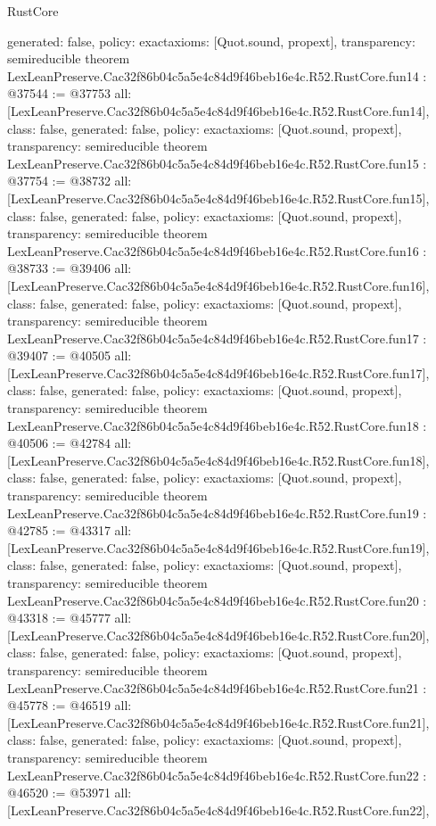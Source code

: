 \begin{lexlean}{RustCore}
\begin{coremodule}
{  generated: false,
  policy: exact{axioms: [Quot.sound, propext]},
  transparency: semireducible
}
theorem LexLeanPreserve.Cac32f86b04c5a5e4c84d9f46beb16e4c.R52.RustCore.fun14 : @37544 := @37753 {
  all: [LexLeanPreserve.Cac32f86b04c5a5e4c84d9f46beb16e4c.R52.RustCore.fun14],
  class: false,
  generated: false,
  policy: exact{axioms: [Quot.sound, propext]},
  transparency: semireducible
}
theorem LexLeanPreserve.Cac32f86b04c5a5e4c84d9f46beb16e4c.R52.RustCore.fun15 : @37754 := @38732 {
  all: [LexLeanPreserve.Cac32f86b04c5a5e4c84d9f46beb16e4c.R52.RustCore.fun15],
  class: false,
  generated: false,
  policy: exact{axioms: [Quot.sound, propext]},
  transparency: semireducible
}
theorem LexLeanPreserve.Cac32f86b04c5a5e4c84d9f46beb16e4c.R52.RustCore.fun16 : @38733 := @39406 {
  all: [LexLeanPreserve.Cac32f86b04c5a5e4c84d9f46beb16e4c.R52.RustCore.fun16],
  class: false,
  generated: false,
  policy: exact{axioms: [Quot.sound, propext]},
  transparency: semireducible
}
theorem LexLeanPreserve.Cac32f86b04c5a5e4c84d9f46beb16e4c.R52.RustCore.fun17 : @39407 := @40505 {
  all: [LexLeanPreserve.Cac32f86b04c5a5e4c84d9f46beb16e4c.R52.RustCore.fun17],
  class: false,
  generated: false,
  policy: exact{axioms: [Quot.sound, propext]},
  transparency: semireducible
}
theorem LexLeanPreserve.Cac32f86b04c5a5e4c84d9f46beb16e4c.R52.RustCore.fun18 : @40506 := @42784 {
  all: [LexLeanPreserve.Cac32f86b04c5a5e4c84d9f46beb16e4c.R52.RustCore.fun18],
  class: false,
  generated: false,
  policy: exact{axioms: [Quot.sound, propext]},
  transparency: semireducible
}
theorem LexLeanPreserve.Cac32f86b04c5a5e4c84d9f46beb16e4c.R52.RustCore.fun19 : @42785 := @43317 {
  all: [LexLeanPreserve.Cac32f86b04c5a5e4c84d9f46beb16e4c.R52.RustCore.fun19],
  class: false,
  generated: false,
  policy: exact{axioms: [Quot.sound, propext]},
  transparency: semireducible
}
theorem LexLeanPreserve.Cac32f86b04c5a5e4c84d9f46beb16e4c.R52.RustCore.fun20 : @43318 := @45777 {
  all: [LexLeanPreserve.Cac32f86b04c5a5e4c84d9f46beb16e4c.R52.RustCore.fun20],
  class: false,
  generated: false,
  policy: exact{axioms: [Quot.sound, propext]},
  transparency: semireducible
}
theorem LexLeanPreserve.Cac32f86b04c5a5e4c84d9f46beb16e4c.R52.RustCore.fun21 : @45778 := @46519 {
  all: [LexLeanPreserve.Cac32f86b04c5a5e4c84d9f46beb16e4c.R52.RustCore.fun21],
  class: false,
  generated: false,
  policy: exact{axioms: [Quot.sound, propext]},
  transparency: semireducible
}
theorem LexLeanPreserve.Cac32f86b04c5a5e4c84d9f46beb16e4c.R52.RustCore.fun22 : @46520 := @53971 {
  all: [LexLeanPreserve.Cac32f86b04c5a5e4c84d9f46beb16e4c.R52.RustCore.fun22],
}
\end{coremodule}
\end{lexlean}
